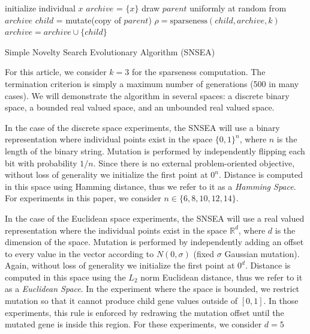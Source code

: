 \documentclass[twoside]{article}
\newcommand{\IR}{\mathbb{R}}
\begin{document}
\begin{algorithm}[h]
  \SetAlgoLined
  \DontPrintSemicolon 
  
  \;
    
  initialize individual $x$\;
  $archive$ = $\{x\}$\;
   {
    draw $parent$ uniformly at random from $archive$\;
    $child$ = mutate(copy of $parent$)\;
    $\rho = \mbox{sparseness}(child, archive, k)$\;
     {
      $archive = archive \cup \{child\}$\;
     }
  }
  \caption{Simple Novelty Search Evolutionary Algorithm (SNSEA)}
\end{algorithm}

For this article, we consider $k=3$ for the sparseness computation.  The termination criterion is simply a maximum number of generations (500 in many cases).  We will demonstrate the algorithm in several spaces: a discrete binary space, a bounded real valued space, and an unbounded real valued space.  

In the case of the discrete space experiments, the SNSEA will use a binary representation where individual points exist in the space $\{0,1\}^n$, where $n$ is the length of the binary string.  Mutation is performed by independently flipping each bit with probability $1/n$.  Since there is no external problem-oriented objective, without loss of generality we initialize the first point at $0^n$.  Distance is computed in this space using Hamming distance, thus we refer to it as a \emph{Hamming Space}.  For experiments in this paper, we consider $n\in\{6,8,10,12,14\}$.

In the case of the Euclidean space experiments, the SNSEA will use a real valued representation where the individual points exist in the space $\IR^d$, where $d$ is the dimension of the space.  Mutation is performed by independently adding an offset to every value in the vector according to $N(0,\sigma)$ (fixed $\sigma$ Gaussian mutation).  Again, without loss of generality we initialize the first point at $0^d$.  Distance is computed in this space using the $L_2$ norm Euclidean distance, thus we refer to it as a \emph{Euclidean Space}.  In the experiment where the space is bounded, we restrict mutation so that it cannot produce child gene values outside of $[0,1]$.  In those experiments, this rule is enforced by redrawing the mutation offset until the mutated gene is inside this region.  For these experiments, we consider $d=5$
\end{document}
